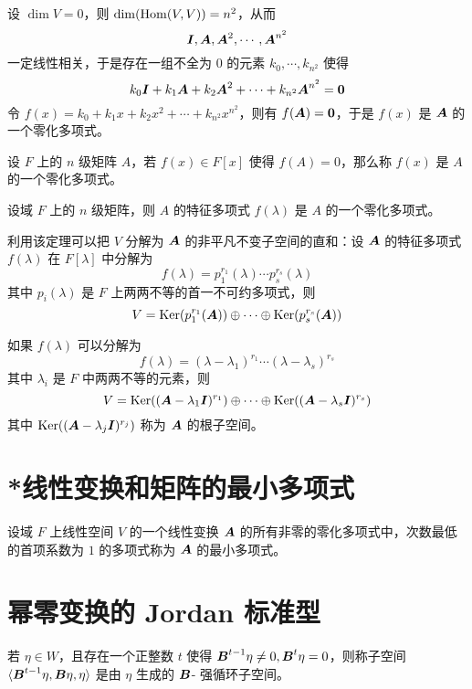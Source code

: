 设 $\dim V = 0$，则 $\dim(\operatorname{Hom}(V,V)) = n^2$，从而
\[ \boldsymbol{I}, \boldsymbol{A}, \boldsymbol{A}^2, \cdots, \boldsymbol{A}^{n^2} \]
一定线性相关，于是存在一组不全为 $0$ 的元素 $k_0,\cdots,k_{n^2}$ 使得
\[ k_0\boldsymbol{I} + k_1\boldsymbol{A} + k_2\boldsymbol{A}^2 + \cdots + k_{n^2}\boldsymbol{A}^{n^2} = \boldsymbol{0} \]
令 $f(x) = k_0 + k_1x + k_2x^2 + \cdots + k_{n^2}x^{n^2}$，则有 $f(\boldsymbol{A}) = \boldsymbol{0}$，于是 $f(x)$ 是 $\boldsymbol{A}$ 的一个零化多项式。

\begin{definition}
	设 $F$ 上的 $n$ 级矩阵 $A$，若 $f(x) \in F[x]$ 使得 $f(A) = 0$，那么称 $f(x)$ 是 $A$ 的一个零化多项式。
\end{definition}

\begin{theorem}
	设域 $F$ 上的 $n$ 级矩阵，则 $A$ 的特征多项式 $f(\lambda)$ 是 $A$ 的一个零化多项式。
\end{theorem}

利用该定理可以把 $V$ 分解为 $\boldsymbol{A}$ 的非平凡不变子空间的直和：设 $\boldsymbol{A}$ 的特征多项式 $f(\lambda)$ 在 $F[\lambda]$ 中分解为
\[ f(\lambda) = p_1^{r_1}(\lambda) \cdots p_s^{r_s}(\lambda) \]
其中 $p_i(\lambda)$ 是 $F$ 上两两不等的首一不可约多项式，则
\[ V = \operatorname{Ker}(p_1^{r_1}(\boldsymbol{A})) \oplus \cdots \oplus \operatorname{Ker}(p_s^{r_s}(\boldsymbol{A})) \]

如果 $f(\lambda)$ 可以分解为
\[ f(\lambda) = (\lambda - \lambda_1)^{r_1} \cdots (\lambda - \lambda_s)^{r_s} \]
其中 $\lambda_i$ 是 $F$ 中两两不等的元素，则
\[ V = \operatorname{Ker}((\boldsymbol{A} - \lambda_1\boldsymbol{I})^{r_1}) \oplus \cdots \oplus \operatorname{Ker}((\boldsymbol{A} - \lambda_s\boldsymbol{I})^{r_s}) \]
其中 $\operatorname{Ker}((\boldsymbol{A} - \lambda_j\boldsymbol{I})^{r_j})$ 称为 $\boldsymbol{A}$ 的根子空间。

\section{*线性变换和矩阵的最小多项式}

\begin{definition}[最小多项式] 
	设域 $F$ 上线性空间 $V$ 的一个线性变换 $\boldsymbol{A}$ 的所有非零的零化多项式中，次数最低的首项系数为 $1$ 的多项式称为 $\boldsymbol{A}$ 的最小多项式。
\end{definition}

\section{幂零变换的 Jordan 标准型}

\begin{definition}
	若 $\eta \in W$，且存在一个正整数 $t$ 使得 $\boldsymbol{B}^{t-1}\eta \ne 0, \boldsymbol{B}^t\eta = 0$，则称子空间 $\langle \boldsymbol{B}^{t-1}\eta,\boldsymbol{B}\eta,\eta \rangle$ 是由 $\eta$ 生成的 $\boldsymbol{B}$- 强循环子空间。 
\end{definition}

